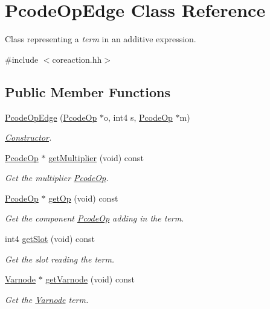 \hypertarget{class_pcode_op_edge}{}\section{Pcode\+Op\+Edge Class Reference}
\label{class_pcode_op_edge}


Class representing a {\itshape term} in an additive expression.  




{\ttfamily \#include $<$coreaction.\+hh$>$}

\subsection*{Public Member Functions}
\begin{DoxyCompactItemize}
\item 
\mbox{\hyperlink{class_pcode_op_edge_a550ff17880a333cf32f2adbc8957bf83}{Pcode\+Op\+Edge}} (\mbox{\hyperlink{class_pcode_op}{Pcode\+Op}} $\ast$o, int4 s, \mbox{\hyperlink{class_pcode_op}{Pcode\+Op}} $\ast$m)
\begin{DoxyCompactList}\small\item\em \mbox{\hyperlink{class_constructor}{Constructor}}. \end{DoxyCompactList}\item 
\mbox{\hyperlink{class_pcode_op}{Pcode\+Op}} $\ast$ \mbox{\hyperlink{class_pcode_op_edge_aa4f87dadda848fc456bdfe550b89db10}{get\+Multiplier}} (void) const
\begin{DoxyCompactList}\small\item\em Get the multiplier \mbox{\hyperlink{class_pcode_op}{Pcode\+Op}}. \end{DoxyCompactList}\item 
\mbox{\hyperlink{class_pcode_op}{Pcode\+Op}} $\ast$ \mbox{\hyperlink{class_pcode_op_edge_aa56a59bcdce0127c0139485826907c62}{get\+Op}} (void) const
\begin{DoxyCompactList}\small\item\em Get the component \mbox{\hyperlink{class_pcode_op}{Pcode\+Op}} adding in the term. \end{DoxyCompactList}\item 
int4 \mbox{\hyperlink{class_pcode_op_edge_a8b40723125dbecd73f094e433fddfcfd}{get\+Slot}} (void) const
\begin{DoxyCompactList}\small\item\em Get the slot reading the term. \end{DoxyCompactList}\item 
\mbox{\hyperlink{class_varnode}{Varnode}} $\ast$ \mbox{\hyperlink{class_pcode_op_edge_a7370222430597b35d3efd7a6221d7795}{get\+Varnode}} (void) const
\begin{DoxyCompactList}\small\item\em Get the \mbox{\hyperlink{class_varnode}{Varnode}} term. \end{DoxyCompactList}\end{DoxyCompactItemize}


